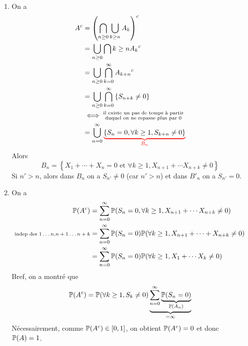 {\begin{td-sol}[]
\begin{enumerate}
\begin{enumerate}
                \item On a
                \begin{equation*}
                    \begin{aligned}
                        A^c
                        &= {\left(\bigcap_{n\geq 0}\bigcup_{k\geq n}A_k\right)}^c\\
                        &= \bigcup_{n\geq 0}\bigcap{k\geq n}{A_k}^c\\
                        &=\bigcup_{n\geq 0}\bigcap_{k=0}^\infty {A_{k+n}}^c\\
                        &= \bigcup_{n\geq 0}\bigcap_{k=0}^\infty \left\{S_{n+k}\neq 0\right\}\\
                        &\iff \substack{\text{il existe un pas de temps à partir}\\\text{duquel on ne repasse plus par }0}\\
                        &=\bigcup_{n=0}^\infty \color{red}\underbrace{\color{black}\left\{S_n=0,\forall k\geq 1,S_{k+n}\neq 0\right\}}_{{B_n}}\color{black}
                    \end{aligned}
                \end{equation*}
                Alors
                \begin{equation*}
                    B_n= \left\{ X_1+\cdots+X_n = 0\text{ et }\forall k\geq 1,X_{n+1}+\cdots X_{n+k}\neq 0\right\}
                \end{equation*}
                Si \(n'>n\), alors dans \(B_n\) on a \(S_{n'}\neq 0\) (car \(n'>n\)) et
                dans \(B'_n\) on a \(S_{n'}=0\).

                \item On a
                \begin{equation*}
                    \begin{aligned}
                        \mathbb{P}(A^c) 
                        &= \sum_{n=0}^\infty \mathbb{P}(S_n=0,\forall k\geq 1, X_{n+1}+\cdots X_{n+k}\neq 0)\\
                        \text{\scriptsize{indep des \(1\ldots n\),\(n+1\ldots n+k\)}}&= \sum_{n=0}^\infty\mathbb{P}(S_n = 0)\mathbb{P}(\forall k \geq 1, X_{n+1}+\cdots+ X_{n+k}\neq 0)\\
                        &= \sum_{n=0}^\infty \mathbb{P}(S_n = 0)\mathbb{P}(\forall k\geq 1,X_1+\cdots X_k \neq 0)
                    \end{aligned}
                \end{equation*}
                Bref, on a montré que
                \begin{equation*}
                    \mathbb{P}(A^c) = \mathbb{P}(\forall k\geq 1,S_k\neq 0)\underbrace{\sum_{n=0}^\infty \underbrace{\mathbb{P}(S_n = 0)}_{\mathbb{P}(A_n)}}_{=\infty}
                \end{equation*}
                Nécessairement, comme \(\mathbb{P}(A^c)\in\mathopen{}\left[0,1\right]\mathclose{}\), on obtient
                \(\mathbb{P}(A^c)=0\) et donc \(\mathbb{P}(A)=1\).

            \end{enumerate}
        \end{enumerate}
    \end{td-sol}
}{}
